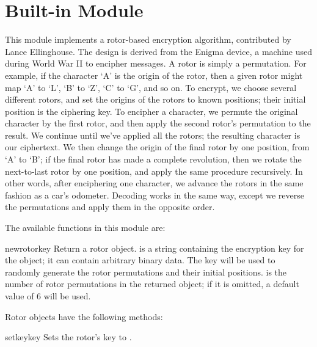 \section{Built-in Module }



This module implements a rotor-based encryption algorithm, contributed by
Lance Ellinghouse.  The design is derived
from the Enigma device, a machine
used during World War II to encipher messages.  A rotor is simply a
permutation.  For example, if the character `A' is the origin of the rotor,
then a given rotor might map `A' to `L', `B' to `Z', `C' to `G', and so on.
To encrypt, we choose several different rotors, and set the origins of the
rotors to known positions; their initial position is the ciphering key.  To
encipher a character, we permute the original character by the first rotor,
and then apply the second rotor's permutation to the result. We continue
until we've applied all the rotors; the resulting character is our
ciphertext.  We then change the origin of the final rotor by one position,
from `A' to `B'; if the final rotor has made a complete revolution, then we
rotate the next-to-last rotor by one position, and apply the same procedure
recursively.  In other words, after enciphering one character, we advance
the rotors in the same fashion as a car's odometer. Decoding works in the
same way, except we reverse the permutations and apply them in the opposite
order.

The available functions in this module are:

\begin{funcdesc}{newrotor}{key}
Return a rotor object.  is a string containing the encryption key
for the object; it can contain arbitrary binary data. The key will be used
to randomly generate the rotor permutations and their initial positions.
 is the number of rotor permutations in the returned object;
if it is omitted, a default value of 6 will be used.
\end{funcdesc}

Rotor objects have the following methods:

\begin{methoddesc}[rotor]{setkey}{key}
Sets the rotor's key to .
\end{methoddesc}

